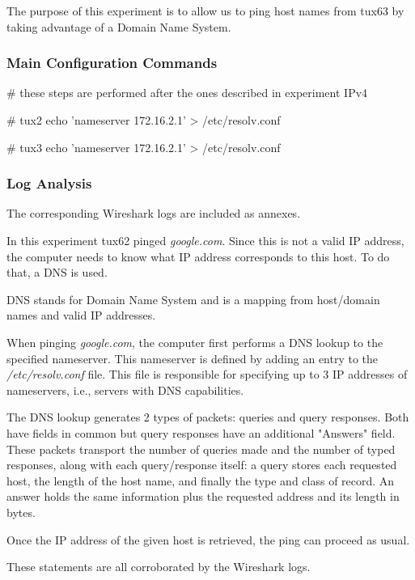\documentclass[11pt,a4paper,twocolumn]{article}
\begin{document}
The purpose of this experiment is to allow us to ping host names from tux63 by taking advantage of a Domain Name System.

\subsubsection{Main Configuration Commands}

\begin{code-bash}
# these steps are performed after the ones described in experiment IPv4

# tux2
echo 'nameserver 172.16.2.1' > /etc/resolv.conf

# tux3
echo 'nameserver 172.16.2.1' > /etc/resolv.conf

\end{code-bash}

\subsubsection{Log Analysis}

The corresponding Wireshark logs are included as annexes.

In this experiment tux62 pinged \textit{google.com}. Since this is not a valid IP address, the computer needs to know what IP address corresponds to this host. To do that, a DNS is used.

DNS stands for Domain Name System and is a mapping from host/domain names and valid IP addresses.

When pinging \textit{google.com}, the computer first performs a DNS lookup to the specified nameserver. This nameserver is defined by adding an entry to the \textit{/etc/resolv.conf} file. This file is responsible for specifying up to 3 IP addresses of nameservers, i.e., servers with DNS capabilities.

The DNS lookup generates 2 types of packets: queries and query responses. Both have fields in common but query responses have an additional "Answers" field. These packets transport the number of queries made and the number of typed responses, along with each query/response itself: a query stores each requested host, the length of the host name, and finally the type and class of record. An answer holds the same information plus the requested address and its length in bytes.

Once the IP address of the given host is retrieved, the ping can proceed as usual.

These statements are all corroborated by the Wireshark logs.
\end{document}
